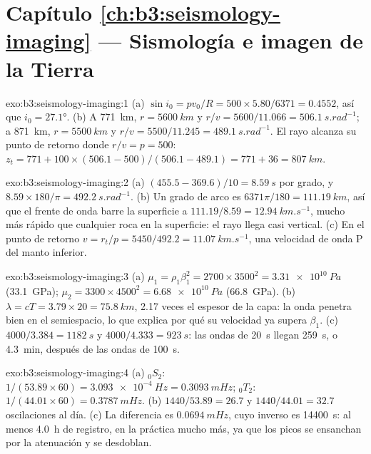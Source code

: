\section*{Capítulo \ref{ch:b3:seismology-imaging} --- Sismología e imagen de la Tierra}

\begin{solution}{exo:b3:seismology-imaging:1}
(a) $\sin i_0 = pv_0/R = 500\times5.80/6371 = 0.4552$, así que $i_0 = \ang{27.1}$.
(b) A \qty{771}{km}, $r = \qty{5600}{km}$ y $r/v = 5600/11.066 =
\qty{506.1}{s.rad^{-1}}$; a \qty{871}{km}, $r = \qty{5500}{km}$ y $r/v =
5500/11.245 = \qty{489.1}{s.rad^{-1}}$. El rayo alcanza su punto de retorno donde $r/v = p = 500$:
$z_t = 771 + 100\times(506.1 - 500)/(506.1 - 489.1) = 771 + 36 =
\qty{807}{km}$.
\end{solution}

\begin{solution}{exo:b3:seismology-imaging:2}
(a) $(455.5 - 369.6)/10 = \qty{8.59}{s}$ por grado, y
$8.59\times180/\pi = \qty{492.2}{s.rad^{-1}}$. (b) Un grado de arco es
$6371\pi/180 = \qty{111.19}{km}$, así que el frente de onda barre la superficie a
$111.19/8.59 = \qty{12.94}{km.s^{-1}}$, mucho más rápido que cualquier roca en la
superficie: el rayo llega casi vertical. (c) En el punto de retorno $v = r_t/p =
5450/492.2 = \qty{11.07}{km.s^{-1}}$, una velocidad de onda P del manto inferior.
\end{solution}

\begin{solution}{exo:b3:seismology-imaging:3}
(a) $\mu_1 = \rho_1\beta_1^2 = 2700\times3500^2 = \qty{3.31e10}{Pa}$
(\qty{33.1}{GPa}); $\mu_2 = 3300\times4500^2 = \qty{6.68e10}{Pa}$
(\qty{66.8}{GPa}). (b) $\lambda = cT = 3.79\times20 = \qty{75.8}{km}$, 2.17
veces el espesor de la capa: la onda penetra bien en el semiespacio, lo que explica
por qué su velocidad ya supera $\beta_1$. (c) $4000/3.384 = \qty{1182}{s}$ y
$4000/4.333 = \qty{923}{s}$: las ondas de 20~s llegan \qty{259}{s}, o
\qty{4.3}{min}, después de las ondas de 100~s.
\end{solution}

\begin{solution}{exo:b3:seismology-imaging:4}
(a) ${}_0S_2$: $1/(53.89\times60) = \qty{3.093e-4}{Hz} = \qty{0.3093}{mHz}$;
${}_0T_2$: $1/(44.01\times60) = \qty{0.3787}{mHz}$. (b) $1440/53.89 = 26.7$
y $1440/44.01 = 32.7$ oscilaciones al día. (c) La diferencia es
$\qty{0.0694}{mHz}$, cuyo inverso es \qty{14400}{s}: al menos \qty{4.0}{h} de
registro, en la práctica mucho más, ya que los picos se ensanchan por la atenuación y
se desdoblan.
\end{solution}

